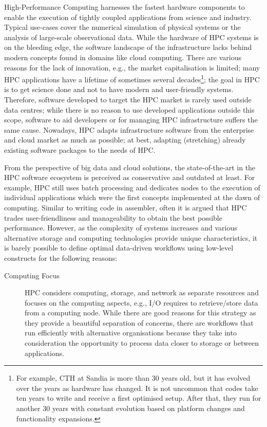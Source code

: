 \documentclass[a4paper]{article}
\begin{document}
{{High-Performance Computing harnesses the fastest hardware components to enable
the execution of tightly coupled applications from science and industry.
Typical use-cases cover the numerical simulation of physical systems or the analysis of large-scale observational data.
While the hardware of HPC systems is on the bleeding edge, the software landscape of the infrastructure lacks behind modern concepts found in domains like cloud computing.
There are various reasons for the lack of innovation, e.g., the market capitalisation is limited; many HPC applications have a lifetime of sometimes several decades\footnote{For example, CTH at Sandia is more than 30 years old, but it has evolved over the years as hardware has changed.
It is not uncommon that codes take ten years to write and receive a first optimised setup.
After that, they run for another 30 years with constant evolution based on platform changes and functionality expansions.}; the goal in HPC is to get science done and not to have modern and user-friendly systems.
Therefore, software developed to target the HPC market is rarely used outside data centres; while there is no reason to use developed applications outside this scope, software to aid developers or for managing HPC infrastructure suffers the same cause.
Nowadays, HPC adapts infrastructure software from the enterprise and cloud market as much as possible; at best, adapting (stretching) already existing software packages to the needs of HPC.

From the perspective of big data and cloud solutions, the state-of-the-art in the HPC software ecosystem is perceived as conservative and outdated at least. For example, HPC still uses batch processing and dedicates nodes to the execution of individual applications which were the first concepts implemented at the dawn of computing.
Similar to writing code in assembler, often it is argued that HPC trades user-friendliness and manageability to obtain the best possible performance.
However, as the complexity of systems increases and various alternative storage and computing technologies provide unique characteristics, it is barely possible to define optimal data-driven workflows using low-level constructs for the following reasons:

\begin{description}

  \item[Computing Focus] HPC considers computing, storage, and network as separate resources and focuses on the computing aspects, e.g., I/O requires to retrieve/store data from a computing node.
  While there are good reasons for this strategy as they provide a beautiful separation of concerns,  there are workflows that run efficiently with alternative organisations because they take into consideration the opportunity to process data closer to storage or between applications.


\end{description}}}
\end{document}
